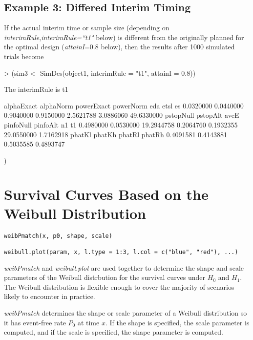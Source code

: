\documentclass[12pt]{article}
\begin{document}
\subsection{Example 3: Differed Interim Timing}
If the actual interim time or sample size (depending on {\it interimRule},{\it interimRule=``t1"} below)
is different from the originally
planned for the optimal design ({\it attainI}=0.8 below), then the results after 1000 simulated trials become
\begin{Schunk}
\begin{Sinput}
> (sim3 <- SimDes(object1, interimRule = "t1", attainI = 0.8))
\end{Sinput}
\begin{Soutput}
 The interimRule is  t1

alphaExact  alphaNorm powerExact  powerNorm        eda       etsl         es
 0.0320000  0.0440000  0.9040000  0.9150000  2.5621788  3.0886060 49.6330000
 pstopNull   pstopAlt       aveE  pinfoNull   pinfoAlt         n1         t1
 0.4980000  0.0530000 19.2944758  0.2064760  0.1932355 29.0550000  1.7162918
    phatKl     phatKh     phatRl     phatRh
 0.4091581  0.4143881  0.5035585  0.4893747
\end{Soutput}
\end{Schunk}
)

\section{Survival Curves Based on the Weibull Distribution}
\label{weibull}
\begin{center}
\begin{verbatim}
weibPmatch(x, p0, shape, scale)

weibull.plot(param, x, l.type = 1:3, l.col = c("blue", "red"), ...)
\end{verbatim}
\end{center}

{\it weibPmatch} and {\it weibull.plot} are used together to determine the shape and scale parameters of the
Weibull distrbution for the survival curves under $H_0$ and $H_1$. The Weibull distribution is flexible enough
to cover the majority of scenarios likely to encounter in practice.

{\it weibPmatch} determines the shape or
scale parameter of a Weibull distribution so it has event-free rate $P_0$ at time $x$. If the shape is specified,
the scale parameter is computed, and if the scale is specified, the shape parameter is computed.
\end{document}
